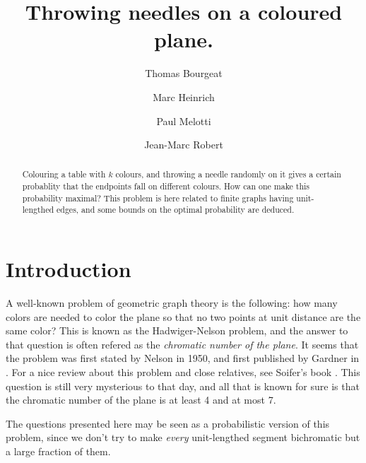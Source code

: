 \documentclass[a4paper,11pt]{article}
\title{Throwing needles on a coloured plane.}
\author{Thomas Bourgeat \and Marc Heinrich \and Paul Melotti 
\and Jean-Marc Robert}
\theoremstyle{definition}
\theoremstyle{remark}
\begin{document}
\maketitle

\begin{abstract} Colouring a table with $k$ colours, and throwing a needle
randomly on it gives a certain probablity that the endpoints fall on 
different colours. How can one make this probability maximal?
This problem is here related to finite graphs having unit-lengthed edges, and 
some bounds on the optimal probability are deduced.\end{abstract}


\section{Introduction}

A well-known problem of geometric graph theory is the following: how many colors
are needed to color the plane so that no two points at unit distance are the 
same color? This is known as the Hadwiger-Nelson problem, and the answer to that
question is often refered as the \textit{chromatic number of the plane}. It 
seems that the problem was first stated by Nelson in 1950, and first published by 
Gardner in \cite{gardner}.
For a nice review about this problem and close relatives, see Soifer's book
\cite{soifer}. This question is still very mysterious to that day, and all that 
is known for sure is that the chromatic number of the plane is at least 4 and at
most 7.

The questions presented here may be seen as a probabilistic version of this 
problem, since we don't try to make \textit{every} unit-lengthed segment 
bichromatic but a large fraction of them.
\end{document}

